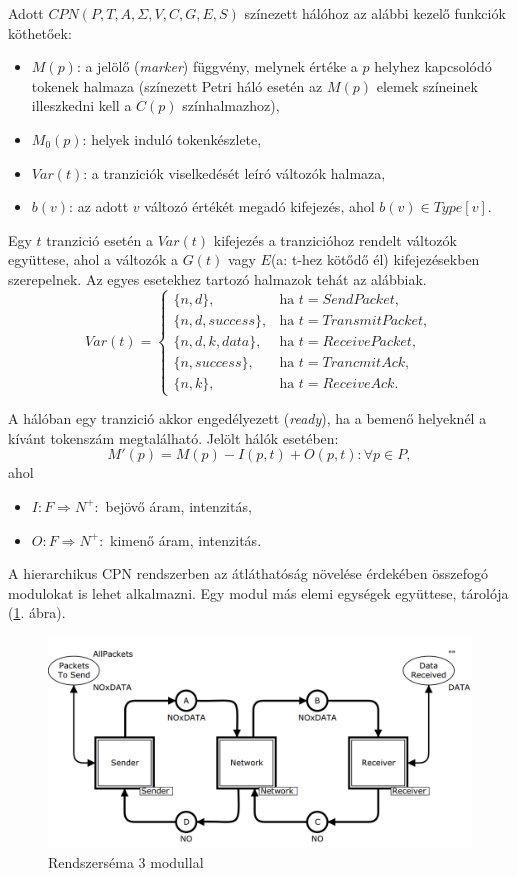 Adott $CPN(P, T, A, \Sigma, V, C, G, E, S)$ színezett hálóhoz az alábbi kezelő funkciók köthetőek: 
\begin{itemize}
\item $M(p)$: a jelölő (\textit{marker}) függvény, melynek értéke a $p$ helyhez kapcsolódó tokenek halmaza (színezett Petri háló esetén az $M(p)$ elemek színeinek illeszkedni kell a $C(p)$ színhalmazhoz),
\item $M_0(p)$: helyek induló tokenkészlete,
\item $Var(t)$: a tranziciók viselkedését leíró változók halmaza,
\item $b(v)$: az adott $v$ változó értékét megadó kifejezés, ahol $b(v) \in Type[v]$.
\end{itemize}

Egy $t$ tranzició esetén a $Var(t)$ kifejezés a tranzicióhoz rendelt változók együttese, ahol a változók a $G(t)$ vagy $E$(a: t-hez kötődő él) kifejezésekben szerepelnek.
Az egyes esetekhez tartozó halmazok tehát az alábbiak.
\begin{equation*}
Var(t)=\begin{cases}
\{n,d\}, &\text{ha } t=SendPacket, \\
\{n,d,success\}, &\text{ha } t= TransmitPacket, \\
\{n,d,k,data\}, &\text{ha } t=ReceivePacket, \\
\{n,success\}, &\text{ha } t=TrancmitAck, \\
\{n,k\}, &\text{ha }t=ReceiveAck.
\end{cases}
\end{equation*}

A hálóban egy tranzició akkor engedélyezett (\textit{ready}), ha a bemenő helyeknél a kívánt tokenszám megtalálható.
Jelölt hálók esetében:
\[
M'(p)=M(p)-I(p,t)+O(p,t): \forall p\in P,
\]
ahol 
\begin{itemize}
\item $I:F\Rightarrow N^+:$  bejövő áram, intenzitás,
\item $O:F\Rightarrow N^+:$ kimenő áram, intenzitás.
\end{itemize}

A hierarchikus CPN rendszerben az átláthatóság növelése érdekében összefogó modulokat is lehet alkalmazni. Egy modul más elemi egységek együttese, tárolója (\ref{fig:schema}. ábra).

\begin{figure}[h!]
\centering
\includegraphics[scale=0.5]{images/rendszersema3modul.png}
\caption{Rendszerséma 3 modullal}
\label{fig:schema}
\end{figure}

